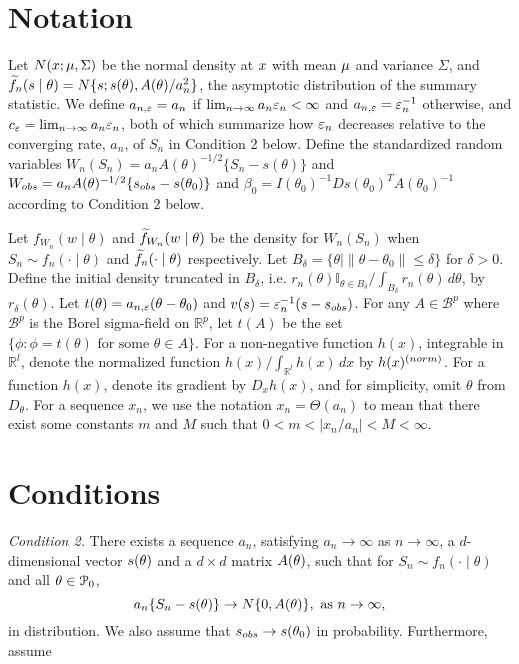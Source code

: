 
\section{Notation}
Let $N(\bx;\bmu,\Sigma)$ be the normal density at $\bx$
with mean $\bmu$ and variance $\Sigma$, and $\ftil_{n}(\bs\mid\btheta)=N\{\bs;\bs(\btheta),A(\btheta)/a_{n}^{2}\}$, the asymptotic distribution of the summary statistic.
We define $a_{n,\veps}=a_{n}$ if $\lim_{n\rightarrow\infty}a_{n}\veps_{n}<\infty$
and $a_{n,\veps}=\veps_{n}^{-1}$ otherwise, and $\ensuremath{c_{\veps}=\lim_{n\rightarrow\infty}a_{n}\veps_{n}}$,
both of which summarize how $\veps_{n}$ decreases relative to the
converging rate, $a_{n}$, of $S_{n}$ in Condition 2 below. Define
the standardized random variables $W_{n}(S_{n})=a_{n}A(\theta)^{-1/2}\{S_{n}-s(\theta)\}$
and $W_{\rm obs}=a_{n}A(\theta)^{-1/2}\{s_{\rm obs}-s(\theta_0)\}$ and $\beta_{0}=I(\theta_0)^{-1}Ds(\theta_0)^{T}A(\theta_0)^{-1}$ according to Condition 2 below. 

Let $f_{W_{n}}(w\mid\theta)$ and
$\ftil_{W_{n}}(w\mid\theta)$ be the density for $W_{n}(S_{n})$ when
$S_{n}\sim f_{n}(\cdot\mid\theta)$ and $\ftil_n(\cdot\mid\theta)$ respectively.
Let $B_{\delta}=\{\theta\mid\|\theta-\theta_{0}\|\leq\delta\}$ for
$\delta>0$. Define the initial density truncated in $B_{\delta}$,
i.e. $r_{n}(\theta)\mathbb{I}_{\theta\in B_{\delta}}/\int_{B_{\delta}}r_{n}(\theta)\,d\theta$,
by $r_{\delta}(\theta)$. Let $t(\theta)=a_{n,\veps}(\theta-\theta_{0})$
and $v(s)=\veps_{n}^{-1}(s - s_{\rm obs})$. For any $A\in\mathscr{B}^{p}$
where $\mathscr{B}^{p}$ is the Borel sigma-field on $\mathbb{R}^{p}$,
let $t(A)$ be the set $\{\phi:\phi=t(\theta)\text{ for some }\theta\in A\}$.
For a non-negative function $h(x)$, integrable in $\mathbb{R}^{l}$,
denote the normalized function $h(x)/\int_{\mathbb{R}^{l}}h(x)\,dx$
by $h(x)^{({\rm norm})}$. For a function $h(x)$, denote its gradient
by $D_{x}h(x)$, and for simplicity, omit $\theta$ from $D_{\theta}$. For a sequence $x_n$, we use the notation $x_n = \Theta(a_n)$ to mean that there exist some constants $m$ and $M$ such that $0<m<\mid x_n/a_n \mid<M<\infty$.


\section{Conditions}

{\it Condition 2.} There exists a sequence $a_{n}$, satisfying $a_{n}\rightarrow\infty$
	as $n\rightarrow\infty$, a $d$-dimensional vector $s(\btheta)$
	and a $d\times d$ matrix $A(\btheta)$, such that for $S_{n}\sim f_{n}(\cdot\mid\theta)$
	and all $\btheta\in\mathcal{P}_{0}$, 
	\[
	a_{n}\{\bS_{n}-s(\btheta)\}\rightarrow N\{0,A(\btheta)\},\mbox{ as \ensuremath{n\rightarrow\infty}},
	\]
	in distribution. We also assume that $\bs_{\rm obs}\rightarrow s(\btheta_{0})$
	in probability. Furthermore, assume
	

